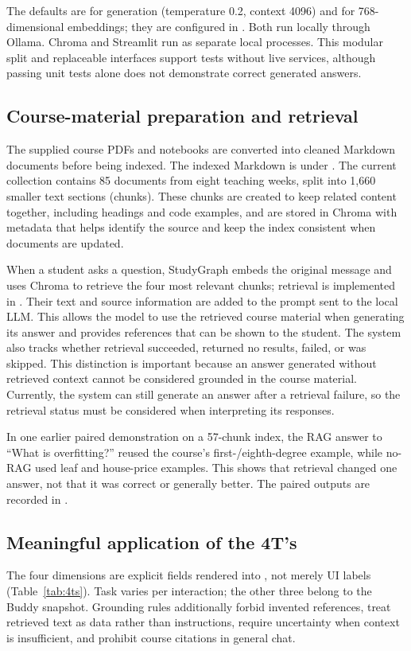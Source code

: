 The defaults are  for generation (temperature 0.2, context 4096)
and  for 768-dimensional embeddings; they are configured in
. Both run locally
through Ollama. Chroma and Streamlit run as separate local processes.
This modular split and replaceable interfaces support tests without live services,
although passing unit tests alone does not demonstrate correct generated answers.

\subsection{Course-material preparation and retrieval}
The supplied course PDFs and notebooks are converted into cleaned Markdown
documents before being indexed. The indexed Markdown is under
. The current collection contains 85 documents
from eight teaching weeks, split into 1,660 smaller text sections (chunks).
These chunks are created to keep related content together, including headings
and code examples, and are stored in Chroma with metadata that helps identify
the source and keep the index consistent when documents are updated.

When a student asks a question, StudyGraph embeds the original message and
uses Chroma to retrieve the four most relevant chunks; retrieval is implemented in
. Their text and source
information are added to the prompt sent to the local LLM. This allows the
model to use the retrieved course material when generating its answer and
provides references that can be shown to the student. The system also tracks
whether retrieval succeeded, returned no results, failed, or was skipped.
This distinction is important because an answer generated without retrieved
context cannot be considered grounded in the course material. Currently,
the system can still generate an answer after a retrieval failure, so the
retrieval status must be considered when interpreting its responses.

In one earlier paired demonstration on a 57-chunk index, the RAG answer
to ``What is overfitting?'' reused the course's first-/eighth-degree example,
while no-RAG used leaf and house-price examples. This shows that retrieval
changed one answer, not that it was correct or generally better. The paired
outputs are recorded in .

\subsection{Meaningful application of the 4T's}
The four dimensions are explicit fields rendered into
, not merely UI labels (Table~\ref{tab:4ts}).
Task varies per interaction; the other three belong to the Buddy snapshot.
Grounding rules additionally forbid invented references, treat retrieved text
as data rather than instructions, require uncertainty when context is
insufficient, and prohibit course citations in general chat.

